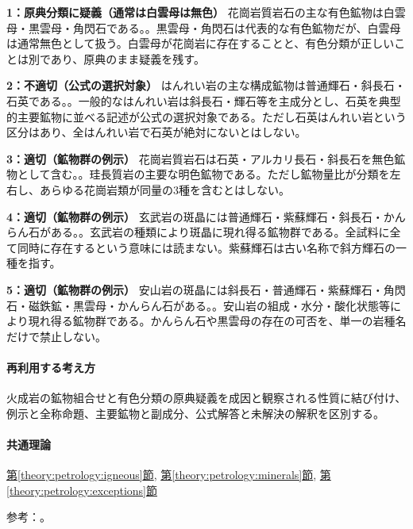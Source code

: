 \noindent\textbf{1：原典分類に疑義（通常は白雲母は無色）} 花崗岩質岩石の主な有色鉱物は白雲母・黒雲母・角閃石である。。黒雲母・角閃石は代表的な有色鉱物だが、白雲母は通常無色として扱う。白雲母が花崗岩に存在することと、有色分類が正しいことは別であり、原典のまま疑義を残す。\par

\noindent\textbf{2：不適切（公式の選択対象）} はんれい岩の主な構成鉱物は普通輝石・斜長石・石英である。。一般的なはんれい岩は斜長石・輝石等を主成分とし、石英を典型的主要鉱物に並べる記述が公式の選択対象である。ただし石英はんれい岩という区分はあり、全はんれい岩で石英が絶対にないとはしない。\par

\noindent\textbf{3：適切（鉱物群の例示）} 花崗岩質岩石は石英・アルカリ長石・斜長石を無色鉱物として含む。。珪長質岩の主要な明色鉱物である。ただし鉱物量比が分類を左右し、あらゆる花崗岩類が同量の3種を含むとはしない。\par

\noindent\textbf{4：適切（鉱物群の例示）} 玄武岩の斑晶には普通輝石・紫蘇輝石・斜長石・かんらん石がある。。玄武岩の種類により斑晶に現れ得る鉱物群である。全試料に全て同時に存在するという意味には読まない。紫蘇輝石は古い名称で斜方輝石の一種を指す。\par

\noindent\textbf{5：適切（鉱物群の例示）} 安山岩の斑晶には斜長石・普通輝石・紫蘇輝石・角閃石・磁鉄鉱・黒雲母・かんらん石がある。。安山岩の組成・水分・酸化状態等により現れ得る鉱物群である。かんらん石や黒雲母の存在の可否を、単一の岩種名だけで禁止しない。\par

\paragraph{再利用する考え方} 火成岩の鉱物組合せと有色分類の原典疑義を成因と観察される性質に結び付け、例示と全称命題、主要鉱物と副成分、公式解答と未解決の解釈を区別する。

\paragraph{共通理論} \hyperref[theory:petrology:igneous]{第\ref*{theory:petrology:igneous}節}, \hyperref[theory:petrology:minerals]{第\ref*{theory:petrology:minerals}節}, \hyperref[theory:petrology:exceptions]{第\ref*{theory:petrology:exceptions}節}

\par 参考：\cite{aist_crystal_colors,gsj_igneous2021,usgs_rock_thesaurus}。

